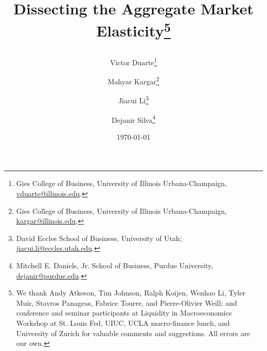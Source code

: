 \usepackage[en-US]{datetime2}
\usepackage{mathtools}
\usepackage{xcolor}

\usepackage{amsmath}
\usepackage{tikz}
\usepackage{mathdots}
\usepackage{cancel}
\usepackage{color}
\usepackage{siunitx}
\usepackage{array}
\usepackage{multirow}
\usepackage{amssymb}
\usepackage{gensymb}
\usepackage{tabularx}
\usepackage{extarrows}
\usepackage{booktabs}
\usetikzlibrary{fadings}
\usetikzlibrary{patterns}
\usetikzlibrary{shadows.blur}
\usetikzlibrary{shapes}



\newcommand{\comments}[1]
{\par {\bfseries \color{blue} #1 \par}}


\title{\textbf{Dissecting the Aggregate Market Elasticity\thanks{We thank Andy Atkeson, Tim Johnson, Ralph Koijen, Wenhao Li, Tyler Muir, Stavros Panageas, Fabrice Tourre, and Pierre-Olivier Weill; and conference and seminar participants at Liquidity in Macroeconomics Workshop at St. Louis Fed, UIUC, UCLA macro-finance lunch, and University of Zurich for valuable comments and suggestions. All errors are our own.}}
\author{ 
Victor Duarte\thanks{Gies College of Business, University of Illinois Urbana-Champaign, \href{mailto:vduarte@illinois.edu}{vduarte@illinois.edu}.}\and 
Mahyar Kargar\thanks{Gies College of Business, University of Illinois Urbana-Champaign, \href{mailto:kargar@illinois.edu}{kargar@illinois.edu}.}\and Jiacui Li\thanks{David Eccles School of Business, University of Utah; \href{mailto:jiacui.li@eccles.utah.edu}{jiacui.li@eccles.utah.edu}.} \and Dejanir Silva\thanks{Mitchell E. Daniels, Jr. School of Business, Purdue University, \href{dejanir@purdue.edu}{dejanir@purdue.edu}.}}
}
\date{\today}



